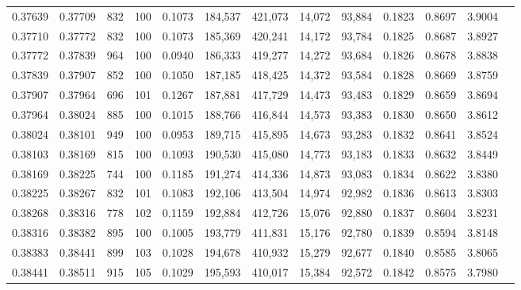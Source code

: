 \begin{tabular}{rrrrrrrrrrrrr}
0.37639 & 0.37709 &   832 & 100 &                                     0.1073 & 184,537 & 421,073 &  14,072 &  93,884 & 0.1823 & 0.8697 & 3.9004 \\
0.37710 & 0.37772 &   832 & 100 &                                     0.1073 & 185,369 & 420,241 &  14,172 &  93,784 & 0.1825 & 0.8687 & 3.8927 \\
0.37772 & 0.37839 &   964 & 100 &                                     0.0940 & 186,333 & 419,277 &  14,272 &  93,684 & 0.1826 & 0.8678 & 3.8838 \\
0.37839 & 0.37907 &   852 & 100 &                                     0.1050 & 187,185 & 418,425 &  14,372 &  93,584 & 0.1828 & 0.8669 & 3.8759 \\
0.37907 & 0.37964 &   696 & 101 &                                     0.1267 & 187,881 & 417,729 &  14,473 &  93,483 & 0.1829 & 0.8659 & 3.8694 \\
0.37964 & 0.38024 &   885 & 100 &                                     0.1015 & 188,766 & 416,844 &  14,573 &  93,383 & 0.1830 & 0.8650 & 3.8612 \\
0.38024 & 0.38101 &   949 & 100 &                                     0.0953 & 189,715 & 415,895 &  14,673 &  93,283 & 0.1832 & 0.8641 & 3.8524 \\
0.38103 & 0.38169 &   815 & 100 &                                     0.1093 & 190,530 & 415,080 &  14,773 &  93,183 & 0.1833 & 0.8632 & 3.8449 \\
0.38169 & 0.38225 &   744 & 100 &                                     0.1185 & 191,274 & 414,336 &  14,873 &  93,083 & 0.1834 & 0.8622 & 3.8380 \\
0.38225 & 0.38267 &   832 & 101 &                                     0.1083 & 192,106 & 413,504 &  14,974 &  92,982 & 0.1836 & 0.8613 & 3.8303 \\
0.38268 & 0.38316 &   778 & 102 &                                     0.1159 & 192,884 & 412,726 &  15,076 &  92,880 & 0.1837 & 0.8604 & 3.8231 \\
0.38316 & 0.38382 &   895 & 100 &                                     0.1005 & 193,779 & 411,831 &  15,176 &  92,780 & 0.1839 & 0.8594 & 3.8148 \\
0.38383 & 0.38441 &   899 & 103 &                                     0.1028 & 194,678 & 410,932 &  15,279 &  92,677 & 0.1840 & 0.8585 & 3.8065 \\
0.38441 & 0.38511 &   915 & 105 &                                     0.1029 & 195,593 & 410,017 &  15,384 &  92,572 & 0.1842 & 0.8575 & 3.7980 \\

\end{tabular}
